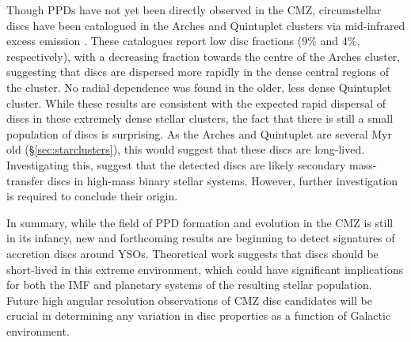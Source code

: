 Though PPDs have not yet been directly observed in the CMZ, circumstellar discs have been catalogued in the Arches and Quintuplet clusters via mid-infrared excess emission \citep{Stolte2010, Stolte2015}. These catalogues report low disc fractions (9\% and 4\%, respectively), with a decreasing fraction towards the centre of the Arches cluster, suggesting that discs are dispersed more rapidly in the dense central regions of the cluster. No radial dependence was found in the older, less dense Quintuplet cluster. While these results are consistent with the expected rapid dispersal of discs in these extremely dense stellar clusters, the fact that there is still a small population of discs is surprising. As the Arches and Quintuplet are several Myr old (\S\ref{sec:starclusters}), this would suggest that these discs are long-lived. Investigating this, \citet{Stolte2015} suggest that the detected discs are likely secondary mass-transfer discs in high-mass binary stellar systems. However, further investigation is required to conclude their origin.

In summary, while the field of PPD formation and evolution in the CMZ is still in its infancy, new and forthcoming results are beginning to detect signatures of accretion discs around YSOs. Theoretical work suggests that discs should be short-lived in this extreme environment, which could have significant implications for both the IMF and planetary systems of the resulting stellar population. Future high angular resolution observations of CMZ disc candidates will be crucial in determining any variation in disc properties as a function of Galactic environment.
